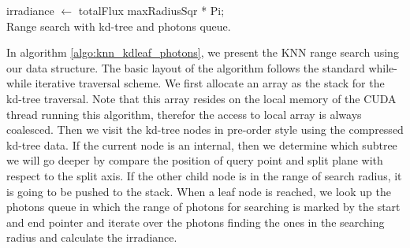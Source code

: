 \begin{algorithm}
	\Return irradiance \(\leftarrow\) totalFlux \/ maxRadiusSqr * Pi; \\
	
	\caption{Range search with kd-tree and photons queue.} 	
	\label{algo:knn_kdleaf_photons}
\end{algorithm}

In algorithm \ref{algo:knn_kdleaf_photons}, we present the KNN range search using our data structure. The basic layout of the algorithm follows the standard while-while iterative traversal scheme.  We first allocate an array as the stack for the kd-tree traversal. Note that this array resides on the local memory of the CUDA thread running this algorithm, therefor the access to local array is always coalesced. Then we visit the kd-tree nodes in pre-order style using the compressed kd-tree data. If the current node is an internal, then we determine which subtree we will go deeper by compare the position of query point and split plane with respect to the split axis. If the other child node is in the range of search radius, it is going to be pushed to the stack. When a leaf node is reached, we look up the photons queue in which the range of photons for searching is marked by the start and end pointer and iterate over the photons finding the ones in the searching radius and calculate the irradiance.

